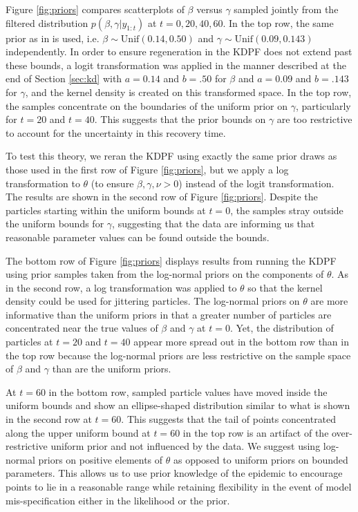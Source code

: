 \documentclass{elsarticle}
\begin{document}
Figure \ref{fig:priors} compares scatterplots of $\beta$ versus $\gamma$ sampled jointly from the filtered distribution $p(\beta,\gamma|y_{1:t})$ at $t = 0, 20, 40, 60$. In the top row, the same prior as in \citet{skvortsov2012monitoring} is used, i.e. $\beta\sim \mbox{Unif}( 0.14, 0.50)$ and $\gamma\sim \mbox{Unif}(0.09, 0.143)$ independently. In order to ensure regeneration in the KDPF does not extend past these bounds, a logit transformation was applied in the manner described at the end of Section \ref{sec:kd} with $a = 0.14$ and $b = .50$ for $\beta$ and $a = 0.09$ and $b = .143$ for $\gamma$, and the kernel density is created on this transformed space. In the top row, the samples concentrate on the boundaries of the uniform prior on $\gamma$, particularly for $t = 20$ and $t = 40$. This suggests that the prior bounds on $\gamma$ are too restrictive to account for the uncertainty in this recovery time.

To test this theory, we reran the KDPF using exactly the same prior draws as those used in the first row of Figure \ref{fig:priors}, but we apply a log transformation to $\theta$ (to ensure $\beta,\gamma,\nu>0$) instead of the logit transformation. The results are shown in the second row of Figure \ref{fig:priors}. Despite the particles starting within the uniform bounds at $t=0$, the samples stray outside the uniform bounds for $\gamma$, suggesting that the data are informing us that reasonable parameter values can be found outside the bounds.

The bottom row of Figure \ref{fig:priors} displays results from running the KDPF using prior samples taken from the log-normal priors on the components of $\theta$. As in the second row, a log transformation was applied to $\theta$ so that the kernel density could be used for jittering particles. The log-normal priors on $\theta$ are more informative than the uniform priors in that a greater number of particles are concentrated near the true values of $\beta$ and $\gamma$ at $t = 0$. Yet, the distribution of particles at $t = 20$ and $t = 40$ appear more spread out in the bottom row than in the top row because the log-normal priors are less restrictive on the sample space of $\beta$ and $\gamma$ than are the uniform priors.

At $t = 60$ in the bottom row, sampled particle values have moved inside the uniform bounds and show an ellipse-shaped distribution similar to what is shown in the second row at $t = 60$. This suggests that the tail of points concentrated along the upper uniform bound at $t = 60$ in the top row is an artifact of the over-restrictive uniform prior and not influenced by the data. We suggest using log-normal priors on positive elements of $\theta$ as opposed to uniform priors on bounded parameters. This allows us to use prior knowledge of the epidemic to encourage points to lie in a reasonable range while retaining flexibility in the event of model mis-specification either in the likelihood or the prior.
\end{document}
